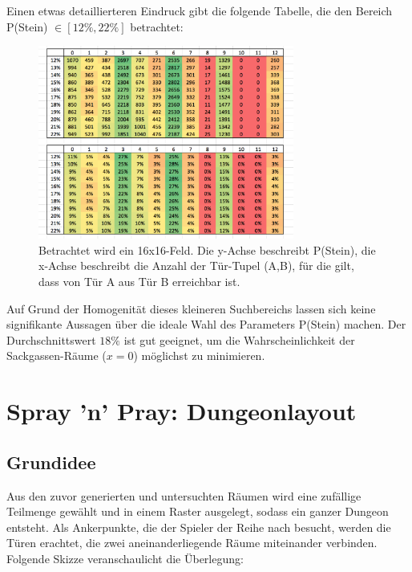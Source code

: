 \documentclass[a4paper,10pt,ngerman]{scrartcl}
\begin{document}
		\newpage


			Einen etwas detaillierteren Eindruck gibt die folgende Tabelle, die den Bereich  P(Stein) \( \in [12\%, 22\% ] \) betrachtet:
			
			\begin{figure}[h!]
				\begin{center}
					\includegraphics[width=0.75\textwidth]{pStein2.png}
					\caption{Betrachtet wird ein 16x16-Feld. Die y-Achse beschreibt P(Stein), die x-Achse beschreibt die Anzahl der Tür-Tupel (A,B), für die gilt, dass von Tür A aus Tür B erreichbar ist.}
				\end{center}
			\end{figure}
		
			Auf Grund der Homogenität dieses kleineren Suchbereichs lassen sich keine signifikante Aussagen über die ideale Wahl des Parameters P(Stein) machen. Der Durchschnittswert \( 18 \% \) ist gut geeignet, um die Wahrscheinlichkeit der Sackgassen-Räume (\( x  = 0 \)) möglichst zu minimieren.






	\newpage
	\section{Spray 'n' Pray: Dungeonlayout}
	
		\subsection{Grundidee}
		
			Aus den zuvor generierten und untersuchten Räumen wird eine zufällige Teilmenge gewählt und in einem Raster ausgelegt, sodass ein ganzer Dungeon entsteht. Als Ankerpunkte, die der Spieler der Reihe nach besucht, werden die Türen erachtet, die zwei aneinanderliegende Räume miteinander verbinden. Folgende Skizze veranschaulicht die Überlegung:
			
\end{document}
